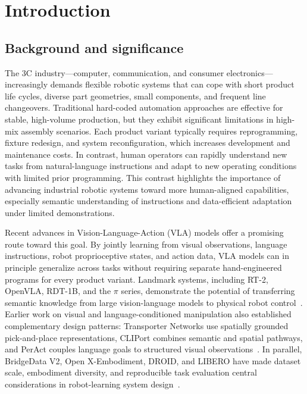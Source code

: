 
\chapter{Introduction}\label{chap:intro}

\section{Background and significance}

The 3C industry---computer, communication, and consumer electronics---increasingly demands flexible robotic systems that can cope with short product life cycles, diverse part geometries, small components, and frequent line changeovers. Traditional hard-coded automation approaches are effective for stable, high-volume production, but they exhibit significant limitations in high-mix assembly scenarios. Each product variant typically requires reprogramming, fixture redesign, and system reconfiguration, which increases development and maintenance costs. In contrast, human operators can rapidly understand new tasks from natural-language instructions and adapt to new operating conditions with limited prior programming. This contrast highlights the importance of advancing industrial robotic systems toward more human-aligned capabilities, especially semantic understanding of instructions and data-efficient adaptation under limited demonstrations.

Recent advances in Vision-Language-Action (VLA) models offer a promising route toward this goal. By jointly learning from visual observations, language instructions, robot proprioceptive states, and action data, VLA models can in principle generalize across tasks without requiring separate hand-engineered programs for every product variant. Landmark systems, including RT-2, OpenVLA, RDT-1B, and the $\pi$ series, demonstrate the potential of transferring semantic knowledge from large vision-language models to physical robot control~\cite{rt2,openvla,rdt1b,pi0}. Earlier work on visual and language-conditioned manipulation also established complementary design patterns: Transporter Networks use spatially grounded pick-and-place representations, CLIPort combines semantic and spatial pathways, and PerAct couples language goals to structured visual observations~\cite{transporter,cliport,peract}. In parallel, BridgeData V2, Open X-Embodiment, DROID, and LIBERO have made dataset scale, embodiment diversity, and reproducible task evaluation central considerations in robot-learning system design~\cite{bridgev2,openx,droid,libero}.


